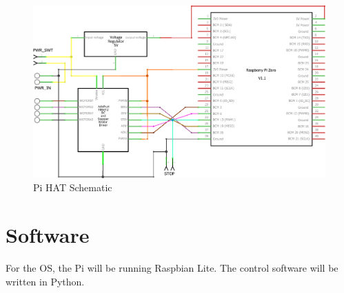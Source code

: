 \documentclass[a4paper,openany,nomultitoc]{dndbook}
\begin{document}
\begin{figure}[hb]
	\begin{center}
		\includegraphics[width=0.95\linewidth]{../PiHat/Pi Hat_schem.png}\\
		{Pi HAT Schematic}
	\end{center}
\end{figure}

\FloatBarrier
\chapter{Software}
\FloatBarrier
\begin{multicols*}{2}

For the OS, the Pi will be running Raspbian Lite.  The control software will be written in Python.

\end{multicols*}
\end{document}

